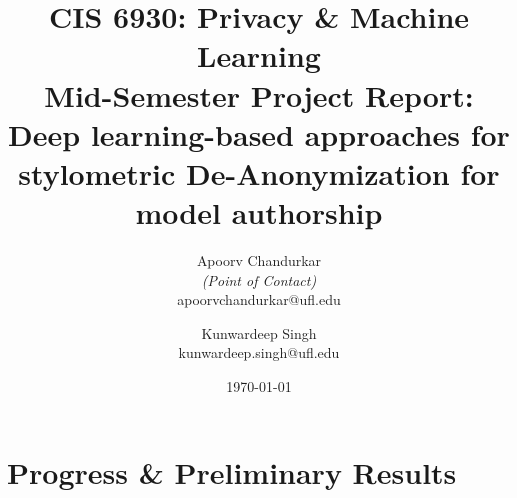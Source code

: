 \documentclass[11pt,letterpaper]{article}
\title{CIS 6930: Privacy \& Machine Learning\\
	\large Mid-Semester Project Report: Deep learning-based approaches for stylometric De-Anonymization for model authorship} %
\author{
        Apoorv Chandurkar \\{\em (Point of Contact)} \\
        apoorvchandurkar@ufl.edu\\
        \and
        Kunwardeep Singh \\
        kunwardeep.singh@ufl.edu\\
}
\date{\today}
\begin{document}

\maketitle




\section{Progress \& Preliminary Results}
\end{document}

